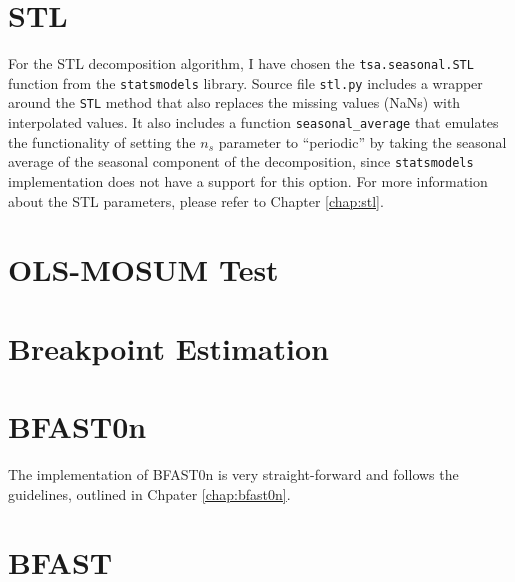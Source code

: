 \documentclass[main.tex]{subfiles}
\begin{document}
\section{STL}
\label{sec:impl_stl}
For the STL decomposition algorithm, I have chosen the \texttt{tsa.seasonal.STL} function
from the \texttt{statsmodels} library. Source file \texttt{stl.py} includes a
wrapper around the \texttt{STL} method that also replaces the missing values
(NaNs) with interpolated values. It also includes a function 
\texttt{seasonal\_average} that emulates the functionality of
setting the $n_s$ parameter to ``periodic'' by taking the seasonal average of
the seasonal component of the decomposition, since \texttt{statsmodels}
implementation does not have a support for this option. For more information
about the STL parameters, please refer to Chapter \ref{chap:stl}.

\section{OLS-MOSUM Test}
\label{sec:impl_mosum}


\section{Breakpoint Estimation}
\label{sec:impl_breakpoints}

\section{BFAST0n}
\label{sec:impl_bfast0n}
The implementation of BFAST0n is very straight-forward and follows the
guidelines, outlined in Chpater \ref{chap:bfast0n}.

\section{BFAST}
\label{sec:bfast}

\biblio
\end{document}

